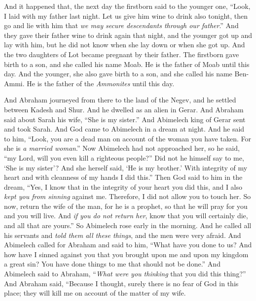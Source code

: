 \begin{biblechapter}
\verse And it happened that, the next day the firstborn said to the younger one, “Look, I laid with my father last night. Let us give him wine to drink also tonight, then go and lie with him that \textit{we may secure descendants through our father}.”
\verse And they gave their father wine to drink again that night, and the younger got up and lay with him, but he did not know when she lay down or when she got up.
\verse And the two daughters of Lot became pregnant by their father.
\verse The firstborn gave birth to a son, and she called his name Moab. He is the father of Moab until this day.
\verse And the younger, she also gave birth to a son, and she called his name Ben-Ammi. He is the father of the \textit{Ammonites} until this day.
\end{biblechapter}

\begin{biblechapter} %
 And Abraham journeyed from there to the land of the Negev, and he settled between Kadesh and Shur. And he dwelled as an alien in Gerar.
\verse And Abraham said about Sarah his wife, “She is my sister.” And Abimelech king of Gerar sent and took Sarah.
\verse And God came to Abimelech in a dream at night. And he said to him, “Look, you are a dead man on account of the woman you have taken. For she is \textit{a married woman}.”
\verse Now Abimelech had not approached her, so he said, “my Lord, will you even kill a righteous people?”
\verse Did not he himself say to me, ‘She is my sister’? And she herself said, ‘He is my brother.’ With integrity of my heart and with cleanness of my hands I did this.”
\verse Then God said to him in the dream, “Yes, I know that in the integrity of your heart you did this, and I also \textit{kept you from sinning} against me. Therefore, I did not allow you to touch her.
\verse So now, return the wife of the man, for he is a prophet, so that he will pray for you and you will live. And \textit{if you do not return her}, know that you will certainly die, and all that are yours.”
\verse So Abimelech rose early in the morning. And he called all his servants and \textit{told them all these things}, and the men were very afraid.
\verse And Abimelech called for Abraham and said to him, “What have you done to us? And how have I sinned against you that you brought upon me and upon my kingdom a great sin? You have done things to me that should not be done.”
\verse And Abimelech said to Abraham, “\textit{What were you thinking} that you did this thing?”
\verse And Abraham said, “Because I thought, surely there is no fear of God in this place; they will kill me on account of the matter of my wife.

\end{biblechapter}
